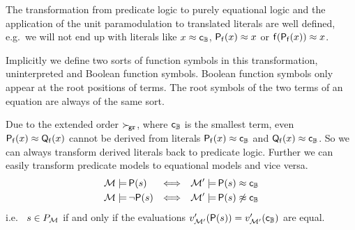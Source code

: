     \begin{remark}
        The transformation from predicate logic
        to purely equational logic
        and the application of the unit para\-modulation
        to translated literals are well defined,
        e.g.\ we will not end up with literals like
        \( x \approx {\mathsf{c}}_{\mathbb{B}} \),
        \( \mathsf{P}_{\mathsf{f}}(x) \approx x \) or
        \( \mathsf{f}(\mathsf{P}_{\mathsf{f}}(x)) \approx x \).

        Implicitly we define two sorts of function symbols in this transformation,
        uninterpreted and Boolean function symbols.
        Boolean function symbols only appear at the root positions of terms.
        The root symbols of the two terms of an equation are always of the same sort.

        Due to the extended order \( \mathrel\succ_{\!\mathtt{gr}} \), where
        \( {\mathsf{c}}_{\mathbb{B}} \) is the smallest term,
        even \( \mathsf{P}_{\mathsf{f}}(x) \approx \mathsf{Q}_{\mathsf{f}}(x) \) cannot be derived from
        literals \( \mathsf{P}_{\mathsf{f}}(x) \approx {\mathsf{c}}_{\mathbb{B}} \) and \(\mathsf{Q}_{\mathsf{f}}(x) \approx {\mathsf{c}}_{\mathbb{B}} \). So we can always transform derived literals back to predicate logic.
        Further we can easily transform predicate models to equational models and vice versa.
        \begin{align*}
            \mathcal{M}\models&\,\mathsf{P}(s)
            &\Longleftrightarrow&&
            \mathcal{M}'\models&\,\mathsf{P}(s)\approx {\mathsf{c}}_{\mathbb{B}}
            \\
            \mathcal{M}\models&\,\lnot\mathsf{P}(s)
            &\Longleftrightarrow&&
            \mathcal{M}'\models&\,\mathsf{P}(s)\not\approx {\mathsf{c}}_{\mathbb{B}}
        \end{align*}
        i.e.\ %
        \( s\in P_{\mathcal{M}} \) if and only if the evaluations
        \( v'_{\mathcal{M}'}(\mathsf{P}(s)) = v'_{\mathcal{M}'}({\mathsf{c}}_{\mathbb{B}}) \) are equal.
    \end{remark}














